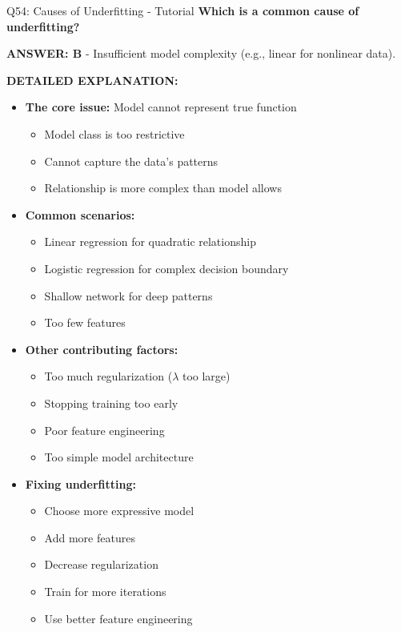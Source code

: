 \documentclass[8pt]{beamer}
\begin{document}
	\begin{frame}{Q54: Causes of Underfitting - Tutorial}
		\fontsize{6.5}{7.5}\selectfont
		\textbf{Which is a common cause of underfitting?}
		
		\vspace{0.05cm}
		\textcolor{myblue}{\textbf{ANSWER: B}} - Insufficient model complexity (e.g., linear for nonlinear data).
		
		\vspace{0.05cm}
		\textbf{DETAILED EXPLANATION:}
		\begin{itemize}
			\item \textbf{The core issue:} Model cannot represent true function
			\begin{itemize}
				\item Model class is too restrictive
				\item Cannot capture the data's patterns
				\item Relationship is more complex than model allows
			\end{itemize}
			\item \textbf{Common scenarios:}
			\begin{itemize}
				\item Linear regression for quadratic relationship
				\item Logistic regression for complex decision boundary
				\item Shallow network for deep patterns
				\item Too few features
			\end{itemize}
			\item \textbf{Other contributing factors:}
			\begin{itemize}
				\item Too much regularization ($\lambda$ too large)
				\item Stopping training too early
				\item Poor feature engineering
				\item Too simple model architecture
			\end{itemize}
			\item \textbf{Fixing underfitting:}
			\begin{itemize}
				\item Choose more expressive model
				\item Add more features
				\item Decrease regularization
				\item Train for more iterations
				\item Use better feature engineering
			\end{itemize}
		\end{itemize}
		

\end{frame}
\end{document}
